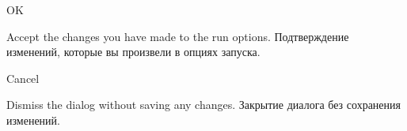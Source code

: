 \begin{popup}
\caption{OK}

\ifenglish
Accept the changes you have made to the run options.
 \else
Подтверждение изменений, которые вы произвели в опциях запуска.
 \fi
\end{popup}

\begin{popup}
\caption{Cancel}

\ifenglish
Dismiss the dialog without saving any changes.
 \else
Закрытие диалога без сохранения изменений.
\fi
\end{popup}

